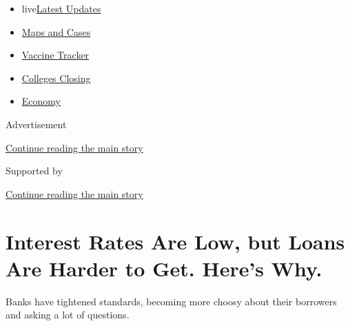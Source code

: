 \begin{itemize}
\tightlist
\item
  live\href{https://www.nytimes3xbfgragh.onion/2020/08/20/world/coronavirus-covid.html?name=styln-coronavirus-national\&region=TOP_BANNER\&variant=undefined\&block=storyline_menu_recirc\&action=click\&pgtype=Article\&impression_id=66c739c1-e376-11ea-9f78-6b3cee7e2386}{Latest
  Updates}
\item
  \href{https://www.nytimes3xbfgragh.onion/interactive/2020/us/coronavirus-us-cases.html?name=styln-coronavirus-national\&region=TOP_BANNER\&variant=undefined\&block=storyline_menu_recirc\&action=click\&pgtype=Article\&impression_id=66c760d0-e376-11ea-9f78-6b3cee7e2386}{Maps
  and Cases}
\item
  \href{https://www.nytimes3xbfgragh.onion/interactive/2020/science/coronavirus-vaccine-tracker.html?name=styln-coronavirus-national\&region=TOP_BANNER\&variant=undefined\&block=storyline_menu_recirc\&action=click\&pgtype=Article\&impression_id=66c760d1-e376-11ea-9f78-6b3cee7e2386}{Vaccine
  Tracker}
\item
  \href{https://www.nytimes3xbfgragh.onion/2020/08/19/us/colleges-closing-covid.html?name=styln-coronavirus-national\&region=TOP_BANNER\&variant=undefined\&block=storyline_menu_recirc\&action=click\&pgtype=Article\&impression_id=66c760d2-e376-11ea-9f78-6b3cee7e2386}{Colleges
  Closing}
\item
  \href{https://www.nytimes3xbfgragh.onion/live/2020/08/20/business/stock-market-today-coronavirus?name=styln-coronavirus-national\&region=TOP_BANNER\&variant=undefined\&block=storyline_menu_recirc\&action=click\&pgtype=Article\&impression_id=66c760d3-e376-11ea-9f78-6b3cee7e2386}{Economy}
\end{itemize}

Advertisement

\protect\hyperlink{after-top}{Continue reading the main story}

Supported by

\protect\hyperlink{after-sponsor}{Continue reading the main story}

\hypertarget{interest-rates-are-low-but-loans-are-harder-to-get-heres-why}{%
\section{Interest Rates Are Low, but Loans Are Harder to Get. Here's
Why.}\label{interest-rates-are-low-but-loans-are-harder-to-get-heres-why}}

Banks have tightened standards, becoming more choosy about their
borrowers and asking a lot of questions.

